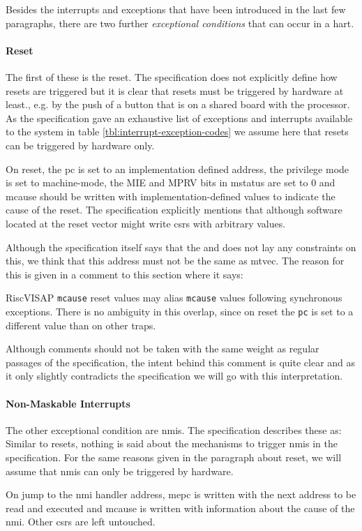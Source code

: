 Besides the interrupts and exceptions that have been introduced in the last few paragraphs, there are two further \textit{exceptional conditions} that can occur in a \gls{hart}.

\paragraph{Reset}
The first of these is the reset.
The specification does not explicitly define how resets are triggered but it is clear that resets must be triggered by hardware at least., e.g. by the push of a button that is on a shared board with the processor.
As the specification gave an exhaustive list of exceptions and interrupts available to the system in table \ref{tbl:interrupt-exception-codes} we assume here that resets can be triggered by hardware only.

On reset, the \gls{pc} is set to an implementation defined address, the privilege mode is set to machine-mode, the MIE and MPRV bits in \gls{mstatus} are set to 0 and \gls{mcause} should be written with implementation-defined values to indicate the cause of the reset.
The specification explicitly mentions that  although software located at the reset vector might write \glspl{csr} with arbitrary values.

Although the specification itself says that the  and does not lay any constraints on this, we think that this address must not be the same as \gls{mtvec}.
The reason for this is given in a comment to this section where it says:
\begin{displaycquote}{RiscVISAP}
    \texttt{mcause} reset values may alias \texttt{mcause} values following synchronous exceptions.
    There is no ambiguity in this overlap, since on reset the \texttt{pc} is set to a different value than on other traps.
\end{displaycquote}

Although comments should not be taken with the same weight as regular passages of the specification, the intent behind this comment is quite clear and as it only slightly contradicts the specification we will go with this interpretation.

\paragraph{Non-Maskable Interrupts}
The other exceptional condition are \glspl{nmi}.
The specification describes these as: 
Similar to resets, nothing is said about the mechanisms to trigger \glspl{nmi} in the specification.
For the same reasons given in the paragraph about reset, we will assume that \glspl{nmi} can only be triggered by hardware.

On jump to the \gls{nmi} handler address, \gls{mepc} is written with the next address to be read and executed and \gls{mcause} is written with information about the cause of the \gls{nmi}.
Other \glspl{csr} are left untouched.
